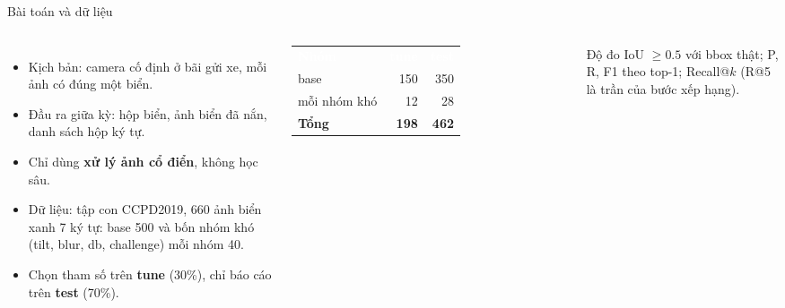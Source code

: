 \documentclass[aspectratio=169,11pt]{beamer}
\newcommand{\code}[1]{{\footnotesize\ttfamily #1}}
\newcommand{\acc}[1]{\textcolor{accent}{\textbf{#1}}}
\newcommand{\hl}[1]{\textcolor{accentdark}{\textbf{#1}}}
\newcommand{\hd}[1]{\cellcolor{accent}\textcolor{white}{\bfseries #1}}
\begin{document}
\begin{frame}{Bài toán và dữ liệu}
  \begin{columns}[T]
    \begin{itemize}
      \item Kịch bản: camera cố định ở bãi gửi xe, mỗi ảnh có đúng một biển.
      \item Đầu ra giữa kỳ: hộp biển, ảnh biển đã nắn, danh sách hộp ký tự.
      \item Chỉ dùng \hl{xử lý ảnh cổ điển}, không học sâu.
      \item Dữ liệu: tập con CCPD2019, 660 ảnh biển xanh 7 ký tự: \code{base} 500 và bốn nhóm khó (\code{tilt}, \code{blur}, \code{db}, \code{challenge}) mỗi nhóm 40.
      \item Chọn tham số trên \acc{tune} (30\%), chỉ báo cáo trên \acc{test} (70\%).
    \end{itemize}
    \vspace{2mm}
    \small
    \begin{tabularx}{\linewidth}{>{\raggedright\arraybackslash}Xrr}
      \rowcolor{accent}\hd{Nhóm} & \hd{tune} & \hd{test}\\
      base & 150 & 350\\
      \rowcolor{accentlight}mỗi nhóm khó & 12 & 28\\
      \textbf{Tổng} & \textbf{198} & \textbf{462}\\
    \end{tabularx}
    \vspace{4mm}

    \begin{block}{Độ đo}
      \small
      IoU $\ge 0.5$ với bbox thật; P, R, F1 theo top-1; Recall@$k$ (R@5 là trần của bước xếp hạng).
    \end{block}
  \end{columns}
\end{frame}
\end{document}
